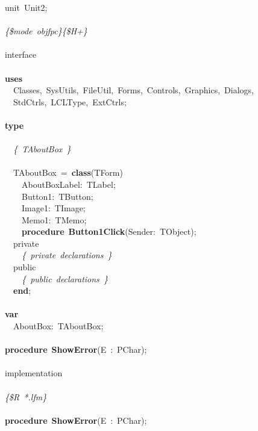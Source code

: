 \noindent
\mbox{}unit\ Unit2; \\
\mbox{} \\
\mbox{}\textit{\{\$mode\ objfpc\}\{\$H+\}} \\
\mbox{} \\
\mbox{}interface \\
\mbox{} \\
\mbox{}\textbf{uses} \\
\mbox{}\ \ Classes,\ SysUtils,\ FileUtil,\ Forms,\ Controls,\ Graphics,\ Dialogs, \\
\mbox{}\ \ StdCtrls,\ LCLType,\ ExtCtrls; \\
\mbox{} \\
\mbox{}\textbf{type} \\
\mbox{} \\
\mbox{}\ \ \textit{\{\ TAboutBox\ \}} \\
\mbox{} \\
\mbox{}\ \ TAboutBox\ =\ \textbf{class}(TForm) \\
\mbox{}\ \ \ \ AboutBoxLabel:\ TLabel; \\
\mbox{}\ \ \ \ Button1:\ TButton; \\
\mbox{}\ \ \ \ Image1:\ TImage; \\
\mbox{}\ \ \ \ Memo1:\ TMemo; \\
\mbox{}\ \ \ \ \textbf{procedure}\ \textbf{Button1Click}(Sender:\ TObject); \\
\mbox{}\ \ private \\
\mbox{}\ \ \ \ \textit{\{\ private\ declarations\ \}} \\
\mbox{}\ \ public \\
\mbox{}\ \ \ \ \textit{\{\ public\ declarations\ \}} \\
\mbox{}\ \ \textbf{end}; \\
\mbox{} \\
\mbox{}\textbf{var} \\
\mbox{}\ \ AboutBox:\ TAboutBox; \\
\mbox{} \\
\mbox{}\textbf{procedure}\ \textbf{ShowError}(E\ :\ PChar); \\
\mbox{} \\
\mbox{}implementation \\
\mbox{} \\
\mbox{}\textit{\{\$R\ *.lfm\}} \\
\mbox{} \\
\mbox{}\textbf{procedure}\ \textbf{ShowError}(E\ :\ PChar); \\
